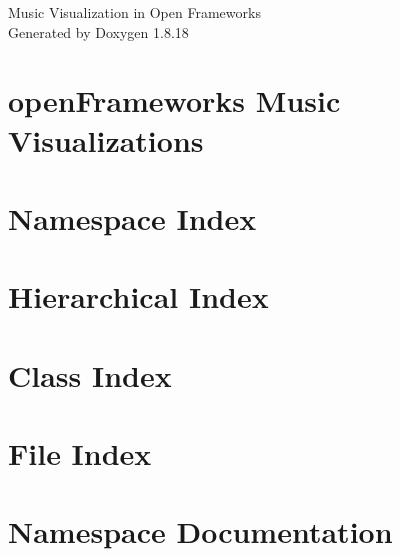 \let\mypdfximage\pdfximage\def\pdfximage{\immediate\mypdfximage}\documentclass[twoside]{book}
\newcommand{\+}{\discretionary{\mbox{\scriptsize$\hookleftarrow$}}{}{}}
\newcommand{\clearemptydoublepage}{%
  \newpage{\pagestyle{empty}\cleardoublepage}%
}
\begin{document}
\hypersetup{pageanchor=false,
             bookmarksnumbered=true,
             pdfencoding=unicode
            }
\begin{titlepage}
\vspace*{7cm}
\begin{center}%
{\Large Music Visualization in Open Frameworks }\\
\vspace*{1cm}
{\large Generated by Doxygen 1.8.18}\\
\end{center}
\end{titlepage}
\clearemptydoublepage
{}
\tableofcontents
\clearemptydoublepage
{}
\hypersetup{pageanchor=true}

\chapter{open\+Frameworks Music Visualizations}
\label{md__r_e_a_d_m_e}

\chapter{Namespace Index}

\chapter{Hierarchical Index}

\chapter{Class Index}

\chapter{File Index}

\chapter{Namespace Documentation}







\end{document}
